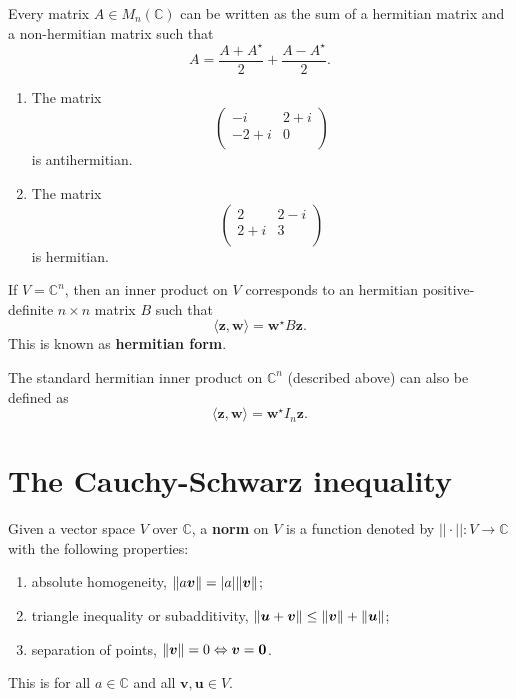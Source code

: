 \begin{proposition}
    Every matrix $A \in M_n(\mathbb{C})$ can be written as the sum of a hermitian matrix and a non-hermitian matrix such that \[ A = \frac{A + A^\star}{2} + \frac{A - A^\star}{2}. \]
\end{proposition}

\begin{example}
    \begin{enumerate}
        \item The matrix
        \[
            \begin{pmatrix}
                -i & 2 + i \\
                -2 + i & 0 \\
            \end{pmatrix}
        \]
        is antihermitian.

        \item The matrix 
        \[
            \begin{pmatrix}
                2 & 2 - i \\
                2 + i & 3 \\
            \end{pmatrix}
        \]
        is hermitian.
    \end{enumerate}
\end{example}

\begin{proposition}
    If $V = \mathbb{C}^n$, then an inner product on $V$ corresponds to an hermitian positive-definite $n \times n$ matrix $B$ such that \[ \langle \bm z, \bm w \rangle = \bm w^\star B \bm z. \] This is known as \textbf{hermitian form}.
\end{proposition}

\begin{example}
    The standard hermitian inner product on $\mathbb{C}^n$ (described above) can also be defined as \[ \langle \bm{z}, \bm{w} \rangle = \bm{w}^\star I_n \bm{z}. \]
\end{example}

\section{The Cauchy-Schwarz inequality}

\begin{definition}[Norm]
    Given a vector space $V$ over $\mathbb{C}$, a \textbf{norm} on $V$ is a function denoted by $|| \cdot || : V \to \mathbb{C}$ with the following properties:
    \begin{enumerate}
        \item absolute homogeneity, $\lVert a \bm{v}\rVert = \lvert a\rvert \lVert\bm{v}\rVert$;
        \item triangle inequality or subadditivity, $\lVert\bm{u} + \bm{v}\rVert \leq \lVert\bm{v}\rVert + \lVert\bm{u}\rVert$;
        \item separation of points, $\lVert\bm{v}\rVert = 0 \Leftrightarrow \bm{v} = \bm{0}$.
    \end{enumerate}
    This is for all $a \in \mathbb{C}$ and all $\bm{v}, \bm{u} \in V$. 
\end{definition}

